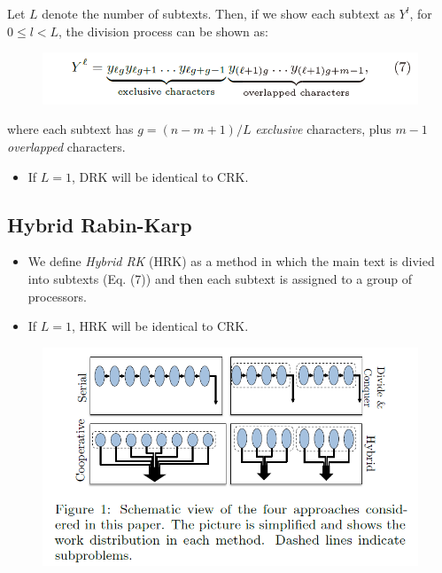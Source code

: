 \begin{frame}
	Let $L$ denote the number of subtexts. Then, if we
	show each subtext as $Y^l$, for $0 \le l < L$, the division
	process can be shown as:
	\begin{figure}
		\includegraphics[scale=0.50]{figure/fig-DC.png}
	\end{figure}
	where each subtext has $g = (n-m+1)/L$ \textit{exclusive} 
	characters, plus $m-1$ \textit{overlapped} characters.
	\begin{itemize}
		\item If $L = 1$, DRK will be identical to CRK.
	\end{itemize}
\end{frame}

\subsection{Hybrid Rabin-Karp}
\begin{frame}
	\begin{itemize}
		\setlength\itemsep{1em}
		\item We define \textit{Hybrid RK} (HRK) as a method in which 
		the main text is divied into subtexts (Eq. (7)) and then each 
		subtext is assigned to a group of processors.
		\item If $L = 1$, HRK will be identical to CRK.
	\end{itemize}
\end{frame}

\begin{frame}
	\begin{figure}
		\includegraphics[scale=0.50]{figure/fig-all.png}
	\end{figure}
\end{frame}

